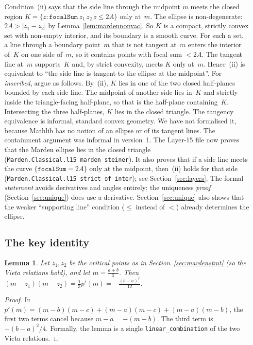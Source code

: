 \documentclass[11pt]{article}
\newtheorem{lemma}[theorem]{Lemma}
\theoremstyle{remark}
\newcommand{\lean}[1]{\texttt{#1}}
\begin{document}
Condition~(ii) says that the side line through the midpoint $m$ meets the closed region
$K=\{z:\lean{focalSum}\ z_1\,z_2\,z\le2A\}$ only at~$m$. The ellipse is non-degenerate:
$2A>|z_1-z_2|$ by Lemma~\ref{lem:mardennonvac}. So $K$ is a compact, strictly convex set with
non-empty interior, and its boundary is a smooth curve. For such a set, a line through a boundary
point~$m$ that is not tangent at~$m$ enters the interior of~$K$ on one side of~$m$, so it contains
points with focal sum $<2A$. The tangent line at~$m$ supports~$K$ and, by strict convexity, meets
$K$ only at~$m$. Hence~(ii) is equivalent to ``the side line is tangent to the ellipse at the
midpoint''. For \emph{inscribed}, argue as follows. By~(ii), $K$ lies in one of the two closed
half-planes bounded by each side line. The midpoint of another side lies in~$K$ and strictly
inside the triangle-facing half-plane, so that is the half-plane containing~$K$. Intersecting the
three half-planes, $K$ lies in the closed triangle. The tangency equivalence is informal,
standard convex geometry. We have not formalised it, because Mathlib has no notion of an
ellipse or of its tangent lines. The containment argument was informal in version~1. The
Layer-15 file now proves that the Marden ellipse lies in the closed triangle
(\lean{Marden.Classical.l15\_marden\_steiner}). It also proves that if a side line meets the curve
$\{\lean{focalSum}=2A\}$ only at the midpoint, then~(ii) holds for that side
(\lean{Marden.Classical.l15\_strict\_of\_inter}); see Section~\ref{sec:layers}. The formal
\emph{statement} avoids derivatives and angles entirely; the uniqueness \emph{proof}
(Section~\ref{sec:unique}) does use a derivative. Section~\ref{sec:unique} also shows that the
weaker ``supporting line'' condition ($\le$ instead of $<$) already determines the ellipse.

\subsection{The key identity}

\begin{lemma}\label{lem:key}
Let $z_1,z_2$ be the critical points as in Section~\ref{sec:mardenstmt} (so the Vieta relations
hold), and let $m=\frac{a+b}2$. Then $(m-z_1)(m-z_2)=\frac13p'(m)=-\frac{(b-a)^2}{12}$.
\end{lemma}
\begin{proof}
In $p'(m)=(m-b)(m-c)+(m-a)(m-c)+(m-a)(m-b)$, the first two terms cancel because $m-a=-(m-b)$.
The third term is $-(b-a)^2/4$. Formally, the lemma is a single \lean{linear\_combination} of the
two Vieta relations.
\end{proof}
\end{document}
